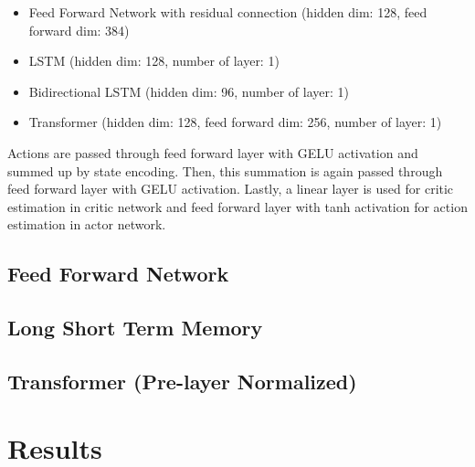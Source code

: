 \begin{itemize}
	\item Feed Forward Network with residual connection (hidden dim: 128, feed forward dim: 384)
	\item LSTM (hidden dim: 128, number of layer: 1)
	\item Bidirectional LSTM (hidden dim: 96, number of layer: 1)
	\item Transformer (hidden dim: 128, feed forward dim: 256, number of layer: 1)
\end{itemize}

Actions are passed through feed forward layer with GELU activation and summed up by state encoding. Then, this summation is again passed through feed forward layer with GELU activation. Lastly, a linear layer is used for critic estimation in critic network and feed forward layer with tanh activation for action estimation in actor network.

\subsection{Feed Forward Network}

\subsection{Long Short Term Memory}

\subsection{Transformer (Pre-layer Normalized)}

\section{Results}
